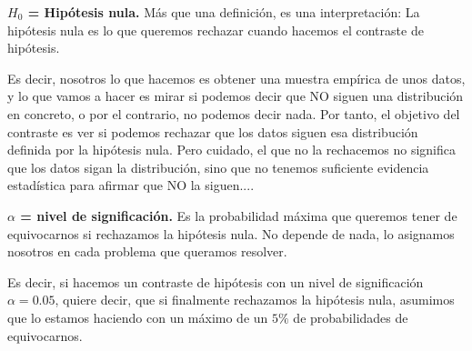 \documentclass[palatino,nochap]{apuntes}
\begin{document}
\begin{defn}{\textbf{$H_0$ = Hipótesis nula. }}
Más que una definición, es una interpretación: La hipótesis nula es lo que queremos rechazar cuando hacemos el contraste de hipótesis.

\begin{expla}
Es decir, nosotros lo que hacemos es obtener una muestra empírica de unos datos, y lo que vamos a hacer es mirar si podemos decir que NO siguen una distribución en concreto, o por el contrario, no podemos decir nada. Por tanto, el objetivo del contraste es ver si podemos rechazar que los datos siguen esa distribución definida por la hipótesis nula. Pero cuidado, el que no la rechacemos no significa que los datos sigan la distribución, sino que no tenemos suficiente evidencia estadística para afirmar que NO la siguen....
\end{expla}
\end{defn}


\begin{defn}{\textbf{$\alpha$ = nivel de significación. }}
Es la probabilidad máxima que queremos tener de equivocarnos si rechazamos la hipótesis nula. No depende de nada, lo asignamos nosotros en cada problema que queramos resolver.

\begin{expla}
Es decir, si hacemos un contraste de hipótesis con un nivel de significación $\alpha =0.05$, quiere decir, que si finalmente rechazamos la hipótesis nula, asumimos que lo estamos haciendo con un máximo de un $5\%$ de probabilidades de equivocarnos.
\end{expla}
\end{defn}
\end{document}

